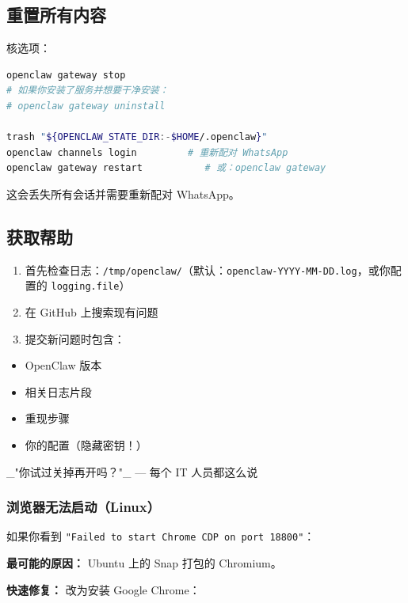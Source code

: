 \subsection{重置所有内容}


核选项：

\begin{lstlisting}[language=bash]
openclaw gateway stop
# 如果你安装了服务并想要干净安装：
# openclaw gateway uninstall

trash "${OPENCLAW_STATE_DIR:-$HOME/.openclaw}"
openclaw channels login         # 重新配对 WhatsApp
openclaw gateway restart           # 或：openclaw gateway
\end{lstlisting}


 这会丢失所有会话并需要重新配对 WhatsApp。

\subsection{获取帮助}


\begin{enumerate}
  \item 首先检查日志：\texttt{/tmp/openclaw/}（默认：\texttt{openclaw-YYYY-MM-DD.log}，或你配置的 \texttt{logging.file}）
  \item 在 GitHub 上搜索现有问题
  \item 提交新问题时包含：
\end{enumerate}

\begin{itemize}
  \item OpenClaw 版本
  \item 相关日志片段
  \item 重现步骤
  \item 你的配置（隐藏密钥！）
\end{itemize}


\hrulefill


\_"你试过关掉再开吗？"\_ — 每个 IT 人员都这么说


\subsubsection{浏览器无法启动（Linux）}


如果你看到 \texttt{"Failed to start Chrome CDP on port 18800"}：

\textbf{最可能的原因：} Ubuntu 上的 Snap 打包的 Chromium。

\textbf{快速修复：} 改为安装 Google Chrome：

